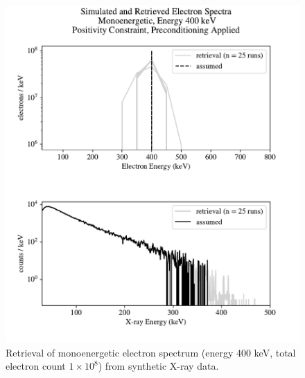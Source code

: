 \begin{figure}[p]
    \centering
    \includegraphics[width=\textwidth]{figures/chapter_4/synthetic_data_examples/mono_400keV_posonly_preconditioning_1e8_particles}
    \caption{Retrieval of monoenergetic electron spectrum (energy 400 keV, total electron count $1\times10^8$) from synthetic X-ray data.}
    \label{why_non_negative_is_good}
\end{figure}

